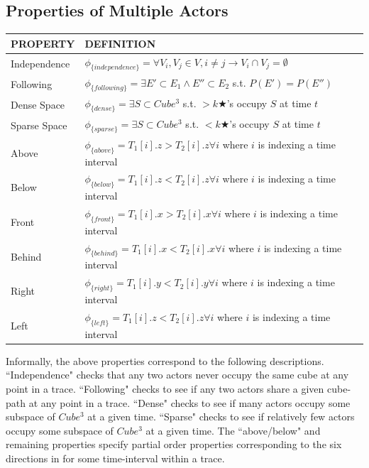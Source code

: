 \subsection{Properties of Multiple Actors}
\begin{tabular}{| p{2.8cm} | p{11.5cm} | }
\hline
PROPERTY & DEFINITION \\ \hline
 Independence& $\phi_{\{independence\}} =  \forall V_i,V_j \in V, i \neq j \rightarrow V_i \cap V_j = \emptyset $ \\ \hline
 Following & $\phi_{\{following\}} =  \exists E' \subset E_1 \land E'' \subset E_2$ s.t. $P(E')=P(E'') $  \\ \hline
 Dense Space & $\phi_{\{dense\}} = \exists S \subset Cube^3$ s.t. $> k \bigstar$'s occupy $S$ at time $t$\\ \hline
 Sparse Space & $\phi_{\{sparse\}} = \exists S \subset Cube^3$ s.t. $< k \bigstar$'s occupy $S$ at time $t$\\ \hline
 Above & $\phi_{\{above\}} =  T_1[i].z > T_2[i].z \forall i$ where $i$ is indexing a time interval\\ \hline
 Below & $\phi_{\{below\}} = T_1[i].z < T_2[i].z \forall i$ where $i$ is indexing a time interval\\ \hline
 Front & $\phi_{\{front\}} = T_1[i].x > T_2[i].x \forall i$ where $i$ is indexing a time interval\\ \hline
 Behind & $\phi_{\{behind\}} = T_1[i].x < T_2[i].x \forall i$ where $i$ is indexing a time interval\\ \hline
 Right & $\phi_{\{right\}} = T_1[i].y < T_2[i].y \forall i$ where $i$ is indexing a time interval \\ \hline
 Left & $\phi_{\{left\}} = T_1[i].z < T_2[i].z \forall i$ where $i$ is indexing a time interval \\ \hline
\end{tabular}

Informally, the above properties correspond to the following descriptions.
``Independence" checks that any two actors never occupy the same cube at any point in a trace.
``Following" checks to see if any two actors share a given cube-path at any point in a trace.
``Dense" checks to see if many actors occupy some subspace of $Cube^3$ at a given time.
``Sparse" checks to see if relatively few actors occupy some subspace of $Cube^3$ at a given time.
The ``above/below" and remaining properties specify partial order properties corresponding to the six directions in \rthree for some time-interval within a trace.

